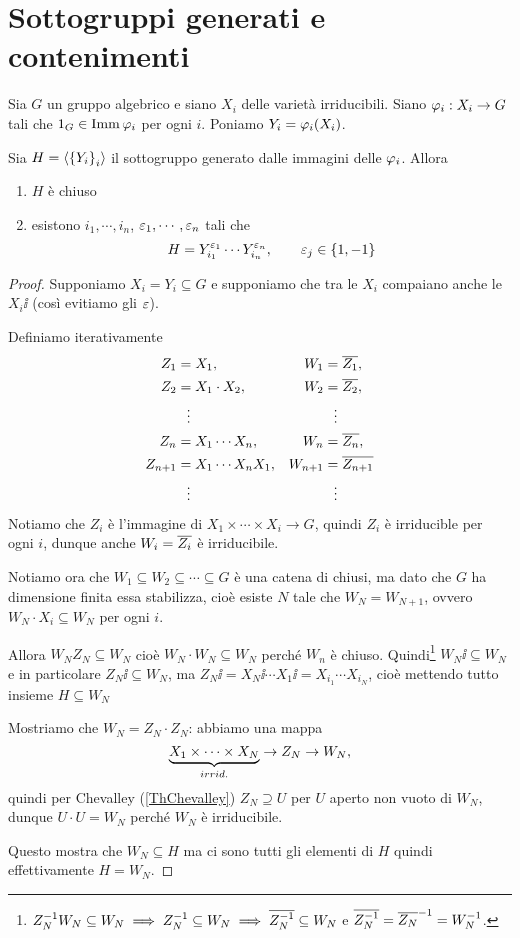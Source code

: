 \section{Sottogruppi generati e contenimenti}
\begin{lemma}
Sia $G$ un gruppo algebrico e siano $X_i$ delle variet\`a irriducibili. Siano $\varphi_i:X_i\to G$ tali che $1_G\in \operatorname{Imm}\varphi_i$ per ogni $i$. Poniamo $Y_i=\varphi_i(X_i)$.

Sia $H=\left\langle {\left\{{Y_i}\right\}_i}\right\rangle$ il sottogruppo generato dalle immagini delle $\varphi_i$. Allora

\begin{enumerate}
	\item $H$ \`e chiuso
	\item esistono $i_1,\cdots, i_n$, $\varepsilon_1,\cdots, \varepsilon_n$ tali che
	\[H=Y_{i_1}^{\varepsilon_1}\cdots Y_{i_n}^{\varepsilon_n},\qquad \varepsilon_j\in\left\{{1,-1}\right\}\]
\end{enumerate}
\end{lemma}
\begin{proof}
Supponiamo $X_i=Y_i\subseteq G$ e supponiamo che tra le $X_i$ compaiano anche le $X_i\ii$ (cos\`i evitiamo gli $\varepsilon$).

Definiamo iterativamente
\begin{align*}
	Z_1&=X_1, &W_1&=\overline{Z_1},\\
	Z_2&=X_1\cdot X_2, &W_2&=\overline{Z_2},\\ 
	&\;\;\vdots &&\;\;\vdots\\	
	Z_n&=X_1\cdots X_n, &W_n&=\overline{Z_n},\\
	Z_{n+1}&=X_1\cdots X_nX_1, &W_{n+1}&=\overline{Z_{n+1}}\\
	&\;\;\vdots &&\;\;\vdots
\end{align*}
Notiamo che $Z_i$ \`e l'immagine di $X_1\times\cdots\times X_i\to G$, quindi $Z_i$ \`e irriducible per ogni $i$, dunque anche $W_i=\overline{Z_i}$ \`e irriducibile.

Notiamo ora che $W_1\subseteq W_2\subseteq\cdots\subseteq G$ \`e una catena di chiusi, ma dato che $G$ ha dimensione finita essa stabilizza, cio\`e esiste $N$ tale che $W_N=W_{N+1}$, ovvero $W_N\cdot X_i\subseteq W_N$ per ogni $i$.

Allora $W_NZ_N\subseteq W_N$ cio\`e $W_N\cdot W_N\subseteq W_N$ perch\'e $W_n$ \`e chiuso. Quindi\footnote{$Z_N^{-1} W_N\subseteq W_N\implies Z_N^{-1}\subseteq W_N\implies \overline{Z_N^{-1}}\subseteq W_N$ e $\overline{Z_N^{-1}}=\overline{Z_N}^{-1}=W_N^{-1}$.} $W_N\ii\subseteq W_N$ e in particolare $Z_N\ii\subseteq W_N$, ma $Z_N\ii=X_N\ii\cdots X_1\ii=X_{i_1}\cdots X_{i_N}$, cio\`e mettendo tutto insieme $H\subseteq W_N$

Mostriamo che $W_N=Z_N\cdot Z_N$: abbiamo una mappa
\[\underset{irrid.}{\underbrace{X_1\times\cdots\times X_N}}\to Z_N\to W_N,\]
quindi per Chevalley (\ref{ThChevalley}) $Z_N\supseteq U$ per $U$ aperto non vuoto di $W_N$, dunque $U\cdot U=W_N$ perch\'e $W_N$ \`e irriducibile.

Questo mostra che $W_N\subseteq H$ ma ci sono tutti gli elementi di $H$ quindi effettivamente $H=W_N$.
\end{proof}


